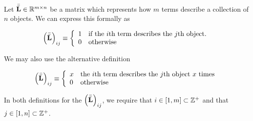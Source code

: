\documentclass[../../ClusteringConnectionsMAIN.tex]{subfiles}
\begin{document}
\begin{flushleft}
\begin{large}

Let $\bar{\bar{\mathbf{L}}} \in \mathbb{R}^{m \times n}$ be a matrix which represents how $m$ terms describe a collection of $n$ objects.  We can express this formally as

\begin{align}
\left( \bar{\bar{\mathbf{L}}} \right)_{ij} \equiv \left\{
\begin{array}{l l}
1 & \text{if the $i$th term describes the $j$th object.} \\
0 & \text{otherwise}
\end{array}
\right.
\end{align}

We may also use the alternative definition

\begin{align}
\left( \bar{\bar{\mathbf{L}}} \right)_{ij} \equiv \left\{
\begin{array}{l l}
x & \text{the $i$th term describes the $j$th object $x$ times} \\
0 & \text{otherwise}
\end{array}
\right.
\end{align}

In both definitions for the $\left( \bar{\bar{\mathbf{L}}} \right)_{ij}$, we require that $i \in \left[ 1, m \right] \subset \mathbb{Z}^+$ and that $j \in \left[ 1, n \right] \subset \mathbb{Z}^+$.

\end{large}
\end{flushleft}
\end{document}
